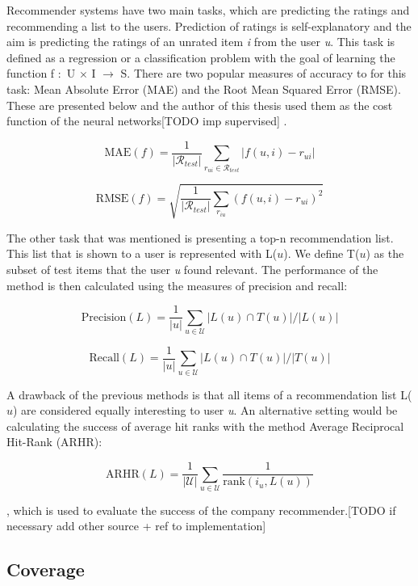 Recommender systems have two main tasks, which are predicting the ratings and recommending a list to the users. Prediction of ratings is self-explanatory and the aim is predicting the ratings of an unrated item \textit{i} from the user \textit{u}. This task is defined as a regression or a classification problem with the goal of learning the function f $\colon$ U $\times$ I $\rightarrow$ S. There are two popular measures of accuracy to for this task: Mean Absolute Error (MAE) and the Root Mean Squared Error (RMSE). These are presented below and the author of this thesis used them as the cost function of the neural networks[TODO imp supervised] \cite{shani2011evaluating}.

$$
\mathrm { MAE } ( f ) = \frac { 1 } { \left| \mathcal { R } _ {test} \right| } \sum _ { r _ { u i } \in \mathcal { R } _ {test} } \left| f ( u , i ) - r _ { u i } \right|
$$


$$
\mathrm { RMSE } ( f ) = \sqrt { \frac { 1 } { \left| \mathcal { R } _ { test} \right| } \sum _ { r _ { i u } } \left( f ( u , i ) - r _ { u i } \right) ^ { 2 } }
$$

The other task that was mentioned  is presenting a top-n recommendation list. This list that is shown to a user is represented with L($u$). We define T($u$) as the subset of test items that the user \textit{u} found relevant. The performance of the method is then calculated using the measures of precision and recall:

$$
\mathrm { Precision } ( L ) = \frac { 1 } { | u | } \sum _ { u \in \mathcal { U } } | L ( u ) \cap T ( u ) | / | L ( u ) |
$$


$$
\mathrm { Recall } ( L ) = \frac { 1 } { | u | } \sum _ { u \in \mathcal { U } } | L ( u ) \cap T ( u ) | / | T ( u ) |
$$

A drawback of the previous methods is that all items of a recommendation list L($u$) are considered equally interesting to user \textit{u}. An alternative setting would be calculating the success of average hit ranks with the method Average Reciprocal Hit-Rank (ARHR):

$$
\mathrm { ARHR } ( L ) = \frac { 1 } { | \mathcal { U } | } \sum _ { u \in \mathcal { U } } \frac { 1 } { \mathrm { rank } \left( i _ { u } , L ( u ) \right) }
$$

, which is used to evaluate the success of the company recommender\cite{shani2011evaluating}.[TODO if necessary add other source + ref to implementation]


\subsection{Coverage}

